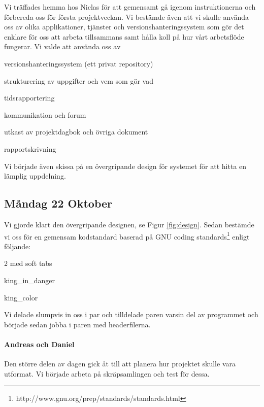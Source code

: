 \documentclass{article}
\begin{document}
Vi träffades hemma hos Niclas för att gemensamt gå igenom instruktionerna och förbereda oss för första projektveckan. Vi bestämde även att vi skulle använda oss av olika applikationer, tjänster och versionshanteringssystem som gör det enklare för oss att arbeta tillsammans samt hålla koll på hur vårt arbetsflöde fungerar. Vi valde att använda oss av

\begin{description} \parskip0pt
  \item[Git och github] versionshanteringssystem (ett privat repository)
  \item[Trello] strukturering av uppgifter och vem som gör vad
  \item[Tickspot] tidsrapportering
  \item[Hipchat] kommunikation och forum
  \item[Google Drive] utkast av projektdagbok och övriga dokument
  \item[\LaTeX] rapportskrivning
\end{description}
Vi började även skissa på en övergripande design för systemet för att hitta en lämplig uppdelning.

\subsection{Måndag 22 Oktober}

Vi gjorde klart den övergripande designen, se Figur \ref{fig:design}. Sedan bestämde vi oss för en gemensam kodstandard baserad på GNU coding standards\footnote{http://www.gnu.org/prep/standards/standards.html} enligt följande:

\begin{description} \parskip0pt
  \item[Tab size] 2 med soft tabs
  \item[Exempel funktionsnamn] king\_in\_danger
  \item[Exempel variabelnamn] king\_color
\end{description}

Vi delade slumpvis in oss i par och tilldelade paren varsin del av programmet och började sedan jobba i paren med headerfilerna.

\paragraph*{Andreas och Daniel} Den större delen av dagen gick åt till att planera hur projektet skulle vara utformat. Vi började arbeta på skräpsamlingen och test för dessa.
\end{document}
